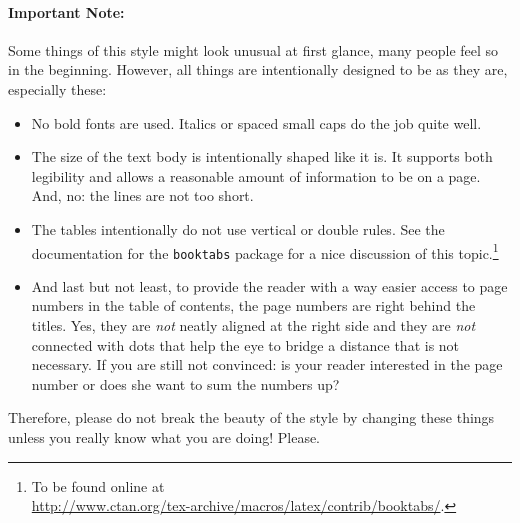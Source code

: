 \paragraph{Important Note:} Some things of this style might look unusual at first glance, many people feel so in the beginning. However, all things are intentionally designed to be as they are, especially these:
\begin{itemize}
\item No bold fonts are used. Italics or spaced small caps do the job quite well.
\item The size of the text body is intentionally shaped like it is. It supports both legibility and allows a reasonable amount of information to be on a page. And, no: the lines are not too short.
\item The tables intentionally do not use vertical or double rules. See the documentation for the \texttt{booktabs} package for a nice discussion of this topic.\footnote{To be found online at \\ \url{http://www.ctan.org/tex-archive/macros/latex/contrib/booktabs/}.}
\item And last but not least, to provide the reader with a way easier access to page numbers in the table of contents, the page numbers are right behind the titles. Yes, they are \emph{not} neatly aligned at the right side and they are \emph{not} connected with dots that help the eye to bridge a distance that is not necessary. If you are still not convinced: is your reader interested in the page number or does she want to sum the numbers up?
\end{itemize}

\noindent Therefore, please do not break the beauty of the style by changing these things unless you really know what you are doing! Please.


